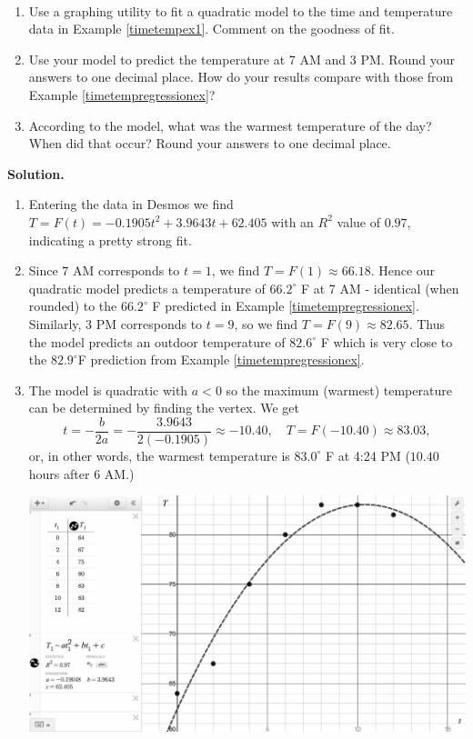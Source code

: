 \documentclass{ximera}
\begin{document}
\begin{ex} \label{TimeTempQRex} $~$

\begin{enumerate}

\item Use a graphing utility to fit a quadratic model to the time and temperature data in Example \ref{timetempex1}.  Comment on the goodness of fit.  

\item  Use your model to predict the temperature at 7 AM and 3 PM.  Round your answers to one decimal place.  How do your results compare with those from Example \ref{timetempregressionex}?

\item  According to the model, what was the warmest temperature of the day?  When did that occur?  Round your answers to one decimal place.

\end{enumerate}

{\bf Solution.}

\begin{enumerate}

\item Entering the data in Desmos we find  $T = F(t)  = -0.1905t^2+ 3.9643t+62.405$ with an $R^2$ value of $0.97$, indicating a pretty strong fit.  

\item Since $7$ AM corresponds to $t=1$, we find $T = F(1) \approx 66.18$.   Hence our quadratic model predicts a temperature of  $66.2^{\circ}$ F at 7 AM - identical (when rounded) to the  $66.2^{\circ}$ F predicted in Example \ref{timetempregressionex}.  Similarly, $3$ PM corresponds to $t = 9$, so we find  $T = F(9) \approx 82.65$.  Thus the model predicts an outdoor temperature of $82.6^{\circ}$ F which is very close to the $82.9^{\circ}$F prediction from Example \ref{timetempregressionex}.

\item The model is quadratic with $a<0$ so the maximum (warmest) temperature can be determined by finding the vertex.  We get \[ t = -\dfrac{b}{2a} = - \dfrac{3.9643}{2( -0.1905)}  \approx -10.40, \quad T = F(-10.40) \approx 83.03,\] or, in other words, the warmest temperature is $83.0^{\circ}$ F at 4:24 PM ($10.40$ hours after 6 AM.)

\begin{center}

 \includegraphics[width=5in]{./QuadraticFunctionsGraphics/TimeTempDataQR.jpg}
 

\end{center}
\end{enumerate}
\end{ex}
\end{document}
